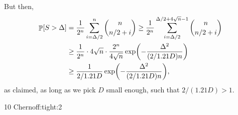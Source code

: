 {{      But then,
      \begin{align*}
          \Prob{S > \Delta}%
          &=%
          \frac{1}{2^n}\sum_{i=\Delta/2}^n \binom{n}{n/2 + i} \geq
          \frac{1}{2^n}\sum_{i=\Delta/2}^{\Delta/2+4\sqrt{n} -1}
          \binom{n}{n/2
             + i} \\
          &\geq%
          \frac{1}{2^n} \cdot 4 \sqrt{n} \cdot \frac{2^n}{4\sqrt{n}}
          \exp \pth{ -
             \frac{\Delta^2}{(2/1.21D)n} }\\
          &\geq \frac{1}{2/1.21D} \exp \pth{ -
             \frac{\Delta^2}{(2/1.21D)n} },
      \end{align*}
      as claimed, as long as we pick $D$ small enough, such that
      $2/(1.21D) > 1$.%
   }%
}

%
{10}%
{Chernoff:tight:2}%
